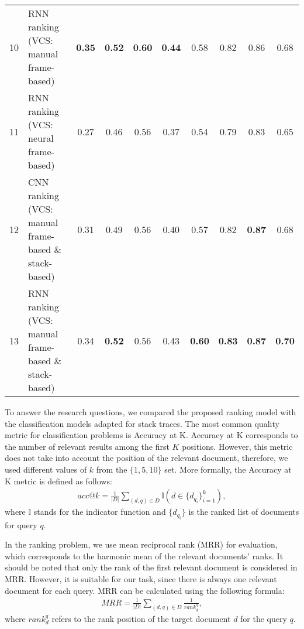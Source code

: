 \begin{table*}
\begin{tabular}{clcccccccc}
        10 & RNN ranking (VCS: manual frame-based) & \textbf{0.35} 
        & \textbf{0.52}	 & \textbf{0.60}	& \textbf{0.44} & 0.58 
        & 0.82 & 0.86 & 0.68 \\ 
        
        11 & RNN ranking (VCS: neural frame-based) & 0.27 
        & 0.46 & 0.56 & 0.37 & 0.54 
        & 0.79 & 0.83 & 0.65 \\ 
        \midrule
        12 & CNN ranking (VCS: manual frame-based \& stack-based) & 0.31 
        & 0.49 &	0.56 & 0.40 & 0.57 
        & 0.82 & \textbf{0.87} & 0.68 \\ 
        
        13 & RNN ranking (VCS: manual frame-based \& stack-based) & 0.34 
        & \textbf{0.52} & 0.56 & 0.43 & \textbf{0.60} 
        & \textbf{0.83} & \textbf{0.87} & \textbf{0.70} \\ 
        \bottomrule
    \end{tabular}
    \label{table:results}
\end{table*}

To answer the research questions, we compared the proposed ranking model with the classification models adapted for stack traces. The most common quality metric for classification problems is Accuracy at K. Accuracy at K corresponds to the number of relevant results among the first $K$ positions. However, this metric does not take into account the position of the relevant document, therefore, we used different values of $k$ from the $\{ 1, 5, 10 \}$ set. More formally, the Accuracy at K metric is defined as follows: 
\begin{align}
    acc@k = \frac{1}{|D|} \sum_{(d, q) \in D} \mathbb{I} \left(d \in \{d_{q_i} \}_{i = 1}^{k} \right),
\end{align}
where $\mathbb{I}$ stands for the indicator function and $\{d_{q_i}\}$ is the ranked list of documents for query $q$.

In the ranking problem, we use mean reciprocal rank (MRR) for evaluation, which corresponds to the harmonic mean of the relevant documents' ranks. It should be noted that only the rank of the first relevant document is considered in MRR. However, it is suitable for our task, since there is always one relevant document for each query. MRR can be calculated using the following formula: 
\begin{align}
    MRR = \frac{1}{|D|} \sum_{(d, q) \in D} \frac{1}{rank_d^q},
\end{align}
where $rank_d^q$ refers to the rank position of the target document $d$ for the query $q$.


